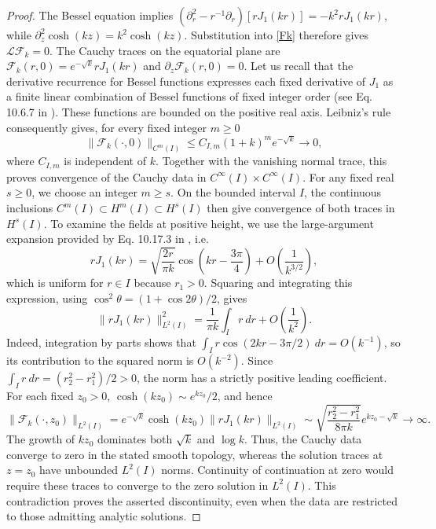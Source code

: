 \documentclass[amsmath,amsfonts,amssymb,aps,pra,superscriptaddress,10pt]{revtex4-2}
\numberwithin{equation}{section}
\theoremstyle{plain}
\theoremstyle{definition}
\theoremstyle{remark}
\theoremstyle{definition}
\begin{document}
\begin{proof}
The Bessel equation implies $\left(\partial_r^2-r^{-1}\partial_r\right)[rJ_1(kr)]=-k^2 rJ_1(kr)$, while $\partial_z^2\cosh{(kz)}=k^2\cosh{(kz)}$. Substitution into \eqref{Fk} therefore gives $\mathcal{L}\mathcal{F}_k=0$. The Cauchy traces on the equatorial plane are $\mathcal{F}_k(r,0)=e^{-\sqrt{k}}rJ_1(kr)$ and $\partial_z\mathcal{F}_k(r,0)=0$. Let us recall that the derivative recurrence for Bessel functions expresses each fixed derivative of $J_1$ as a finite linear combination of Bessel functions of fixed integer order (see Eq. 10.6.7 in \cite{NISTDLMF}). These functions are bounded on the positive real axis. Leibniz's rule consequently gives, for every fixed integer $m\geq 0$
\begin{equation}
\|\mathcal{F}_k(\cdot,0)\|_{C^m(I)}\leq C_{I,m}(1+k)^m e^{-\sqrt{k}}
\longrightarrow 0,
\end{equation}
where $C_{I,m}$ is independent of $k$. Together with the vanishing
normal trace, this proves convergence of the Cauchy data in
$C^\infty(I)\times C^\infty(I)$. For any fixed real $s\geq 0$, we choose an integer $m\geq s$. On the bounded interval $I$, the continuous inclusions $C^m(I)\subset H^m(I)\subset H^s(I)$ then give convergence of both traces in $H^s(I)$. To examine the fields at positive height, we use the large-argument expansion provided by Eq. 10.17.3 in \cite{NISTDLMF}, i.e.
\begin{equation}
rJ_1(kr)=\sqrt{\frac{2r}{\pi k}}\cos{\left(kr-\frac{3\pi}{4}\right)}+O\left(\frac{1}{k^{3/2}}\right),
\end{equation}
which is uniform for $r\in I$ because $r_1>0$. Squaring and integrating this expression, using
$\cos^2{\theta}=(1+\cos{2\theta})/2$, gives
\begin{equation}
\|rJ_1(kr)\|_{L^2(I)}^2=\frac{1}{\pi k}\int_I r~dr+O\left(\frac{1}{k^2}\right).
\end{equation}
Indeed, integration by parts shows that $\int_I r\cos{(2kr-3\pi/2)}~dr=O(k^{-1})$, so its contribution to the squared norm is $O(k^{-2})$. Since $\int_I r~dr=(r_2^2-r_1^2)/2>0$, the norm has a strictly positive leading coefficient. For each fixed $z_0>0$,
$\cosh{(kz_0)}\sim e^{kz_0}/2$, and hence
\begin{equation}
\|\mathcal{F}_k(\cdot,z_0)\|_{L^2(I)}=e^{-\sqrt{k}}\cosh{(kz_0)}
\|rJ_1(kr)\|_{L^2(I)}\sim\sqrt{\frac{r_2^2-r_1^2}{8\pi k}}e^{kz_0-\sqrt{k}}\longrightarrow\infty.
\end{equation}
The growth of $kz_0$ dominates both $\sqrt{k}$ and $\log{k}$. Thus, the Cauchy data converge to zero in the stated smooth topology,
whereas the solution traces at $z=z_0$ have unbounded $L^2(I)$ norms.
Continuity of continuation at zero would require these traces to
converge to the zero solution in $L^2(I)$. This contradiction proves
the asserted discontinuity, even when the data are restricted to
those admitting analytic solutions.
\end{proof}
\end{document}
